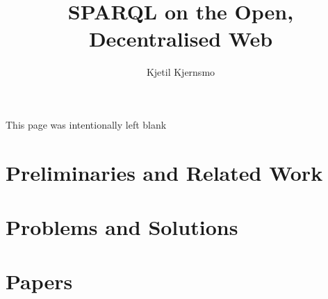 \documentclass[a4paper, 12pt, twoside]{uiophd}
\begin{document}
\title{SPARQL on the Open, Decentralised Web}
\author{Kjetil Kjernsmo}


\frontmatter
\maketitle
\newpage
This page was intentionally left blank
\newpage



\tableofcontents
\mainmatter






\chapter{Preliminaries and Related Work}



\chapter{Problems and Solutions}









\chapter{Papers}
\end{document}
